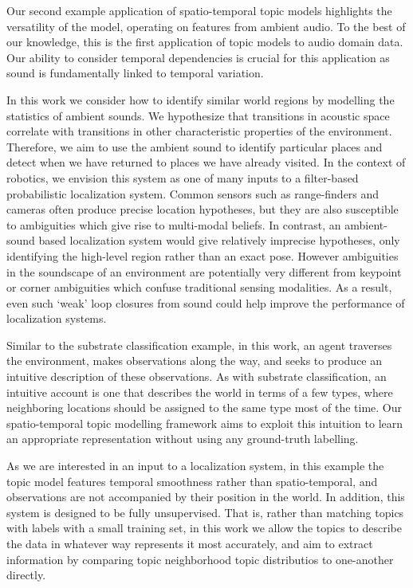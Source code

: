 Our second example application of spatio-temporal topic models highlights the versatility of the model, operating on features from ambient audio. To the best of our knowledge, this is the first application of topic models to audio domain data. Our ability to consider temporal dependencies is crucial for this application as sound is fundamentally linked to temporal variation.

In this work we consider how to identify similar world regions by modelling the statistics of ambient sounds. We hypothesize that transitions in acoustic space correlate with transitions in other characteristic properties of the environment. Therefore, we aim to use the ambient sound to identify particular places and detect when we have returned to places we have already visited. In the context of robotics, we envision this system as one of many inputs to a filter-based probabilistic localization system. Common sensors such as range-finders and cameras often produce precise location hypotheses, but they are also susceptible to ambiguities which give rise to multi-modal beliefs. In contrast, an ambient-sound based localization system would give relatively imprecise hypotheses, only identifying the high-level region rather than an exact pose. However ambiguities in the soundscape of an environment are potentially very different from keypoint or corner ambiguities which confuse traditional sensing modalities. As a result, even such `weak' loop closures from sound could help improve the performance of localization systems.

Similar to the substrate classification example, in this work, an agent traverses the environment, makes observations along the way, and seeks to produce an intuitive description of these observations. As with substrate classification, an intuitive account is one that describes the world in terms of a few types, where neighboring locations should be assigned to the same type most of the time. Our spatio-temporal topic modelling framework aims to exploit this intuition to learn an appropriate representation without using any ground-truth labelling.

As we are interested in an input to a localization system, in this example the topic model features temporal smoothness rather than spatio-temporal, and observations are not accompanied by their position in the world. In addition, this system is designed to be fully unsupervised. That is, rather than matching topics with labels with a small training set, in this work we allow the topics to describe the data in whatever way represents it most accurately, and aim to extract information by comparing topic neighborhood topic distributios to one-another directly.

